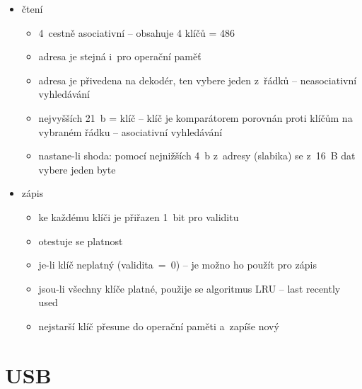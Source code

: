 \documentclass[a4paper,12pt]{article}
\providecommand{\tightlist}{%
\setlength{\itemsep}{0pt}\setlength{\parskip}{0pt}}
\begin{document}
\begin{itemize}
  \tightlist
  \item čtení
  \begin{itemize}
    \tightlist
    \item 4~cestně asociativní -- obsahuje 4 klíčů = 486
    \item adresa je stejná i~pro operační paměť
    \item adresa je přivedena na dekodér, ten vybere jeden z~řádků --
    neasociativní vyhledávání
    \item nejvyšších 21~b = klíč -- klíč je komparátorem porovnán proti klíčům
    na vybraném řádku -- asociativní vyhledávání
    \item nastane-li shoda: pomocí nejnižších 4~b z~adresy (slabika) se z~16~B
    dat vybere jeden byte
  \end{itemize}
  \item zápis
  \begin{itemize}
    \tightlist
    \item ke každému klíči je přiřazen 1~bit pro validitu
    \item otestuje se platnost
    \item je-li klíč neplatný (validita~=~0) -- je možno ho použít pro zápis
    \item jsou-li všechny klíče platné, použije se algoritmus LRU -- last
    recently used
    \item nejstarší klíč přesune do operační paměti a~zapíše nový
  \end{itemize}
\end{itemize}

\section{USB}
\end{document}
